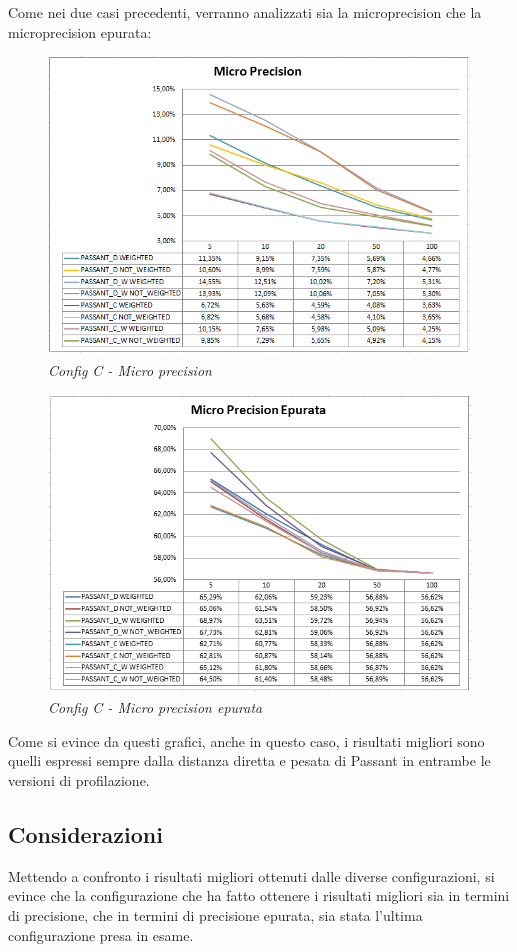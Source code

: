 Come nei due casi precedenti, verranno analizzati sia la microprecision che la microprecision epurata:
\begin{figure}[H]
	\includegraphics[width=.9\textwidth]{./images/graphs/micro_prec_Best}
	\caption{\emph{Config C - Micro precision}}
\end{figure}

\begin{figure}[H]
	\includegraphics[width=.9\textwidth]{./images/graphs/micro_precT_Best}
	\caption{\emph{Config C - Micro precision epurata}}
\end{figure}

Come si evince da questi grafici, anche in questo caso, i risultati migliori sono quelli espressi sempre dalla distanza diretta e pesata di Passant in entrambe le versioni di profilazione. 

\subsection{Considerazioni}
Mettendo a confronto i risultati migliori ottenuti dalle diverse configurazioni, si evince che la configurazione che ha fatto ottenere i risultati migliori sia in termini di precisione, che in termini di precisione epurata, sia stata l'ultima configurazione presa in esame.

